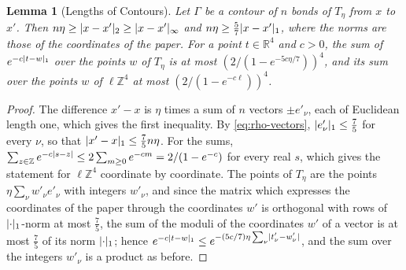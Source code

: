 \documentclass[11pt]{preprint}
\DeclarePairedDelimiter{\abs}{\lvert}{\rvert}
\numberwithin{equation}{section}
\newtheorem{lemma}[theorem]{Lemma}
\theoremstyle{definition}
\theoremstyle{remark}
\theoremstyle{plain}
\begin{document}
\begin{lemma}[Lengths of Contours]\label{lem:contour-length}
Let $\Gamma$ be a contour of $n$ bonds of $T_\eta$ from $x$ to $x'$. Then $n\eta \geq \abs{x - x'}_2 \geq \abs{x - x'}_\infty$ and $n\eta \geq \frac57\abs{x - x'}_1$, where the norms are those of the coordinates of the paper. For a point $t \in \mathbb R^4$ and $c > 0$, the sum of $e^{-c\abs{t - w}_1}$ over the points $w$ of $T_\eta$ is at most $(2/(1 - e^{-5c\eta/7}))^4$, and its sum over the points $w$ of $\ell\mathbb Z^4$ at most $(2/(1 - e^{-c\ell}))^4$.
\end{lemma}

\begin{proof}
The difference $x' - x$ is $\eta$ times a sum of $n$ vectors $\pm e'_\nu$, each of Euclidean length one, which gives the first inequality. By \eqref{eq:rho-vectors}, $\abs{e'_\nu}_1 \leq \frac75$ for every $\nu$, so that $\abs{x' - x}_1 \leq \frac75n\eta$. For the sums, $\sum_{z \in \mathbb Z}e^{-c\abs{s - z}} \leq 2\sum_{m \geq 0}e^{-cm} = 2/(1 - e^{-c})$ for every real $s$, which gives the statement for $\ell\mathbb Z^4$ coordinate by coordinate. The points of $T_\eta$ are the points $\eta\sum_\nu w'_\nu e'_\nu$ with integers $w'_\nu$, and since the matrix which expresses the coordinates of the paper through the coordinates $w'$ is orthogonal with rows of $\abs\cdot_1$-norm at most $\frac75$, the sum of the moduli of the coordinates $w'$ of a vector is at most $\frac75$ of its norm $\abs\cdot_1$; hence $e^{-c\abs{t - w}_1} \leq e^{-(5c/7)\eta\sum_\nu\abs{t'_\nu - w'_\nu}}$, and the sum over the integers $w'_\nu$ is a product as before.
\end{proof}
\end{document}
